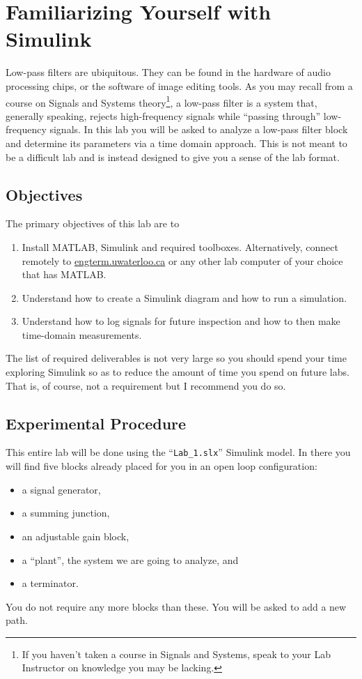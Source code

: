 \chapter{Familiarizing Yourself with Simulink}\label{Lab:1}
Low-pass filters are ubiquitous. They can be found in the hardware of
audio processing chips, or the software of image editing tools. As you may
recall from a course on Signals and Systems theory\footnote{If you haven't
taken a course in Signals and Systems, speak to your Lab Instructor on
knowledge you may be lacking.}, a low-pass filter
is a system that, generally speaking, rejects high-frequency signals while
``passing through'' low-frequency signals. In this lab you will be asked
to analyze a low-pass filter block and determine its parameters via a time
domain approach. This is not meant to be a difficult lab and is instead
designed to give you a sense of the lab format.

\section{Objectives}
The primary objectives of this lab are to
\begin{enumerate}[label=(\arabic*)]
  \item{
    Install MATLAB, Simulink and required toolboxes.
    Alternatively, connect remotely to
    \url{engterm.uwaterloo.ca} or any other lab computer of your choice
    that has MATLAB.
  }
  \item{
    Understand how to create a Simulink diagram and how to run
    a simulation.
  }
  \item{
    Understand how to log signals for future inspection and how to then
    make time-domain measurements.
  }
\end{enumerate}
The list of required deliverables is not very large so you should
spend your time exploring Simulink so as to reduce the amount of time
you spend on future labs. That is, of course, not a requirement but I recommend
you do so.

\section{Experimental Procedure}
This entire lab will be done using the ``\texttt{Lab\_1.slx}'' Simulink model.
In there you will
find five blocks already placed for you in an open loop configuration:
\begin{itemize}
  \item{a signal generator,}
  \item{a summing junction,}
  \item{an adjustable gain block,}
  \item{a ``plant'', the system we are going to analyze, and}
  \item{a terminator.}
\end{itemize}
You do not require any more blocks than these. You will be asked to add
a new path.

